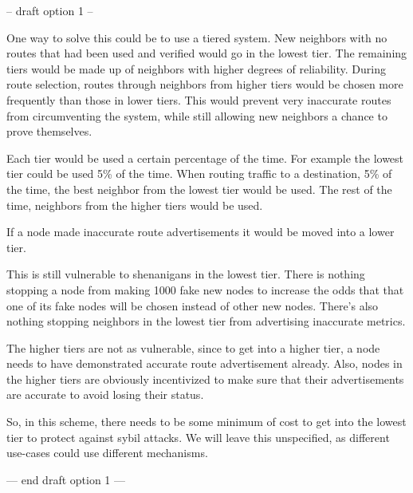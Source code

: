 \documentclass[11pt]{article}
\begin{document}
-- draft option 1 --

One way to solve this could be to use a tiered system. New neighbors with no routes that had been used and verified would go in the lowest tier. The remaining tiers would be made up of neighbors with higher degrees of reliability. During route selection, routes through neighbors from higher tiers would be chosen more frequently than those in lower tiers. This would prevent very inaccurate routes from circumventing the system, while still allowing new neighbors a chance to prove themselves.

Each tier would be used a certain percentage of the time. For example the lowest tier could be used 5\% of the time. When routing traffic to a destination, 5\% of the time, the best neighbor from the lowest tier would be used. The rest of the time, neighbors from the higher tiers would be used.

If a node made inaccurate route advertisements it would be moved into a lower tier.

This is still vulnerable to shenanigans in the lowest tier. There is nothing stopping a node from making 1000 fake new nodes to increase the odds that that one of its fake nodes will be chosen instead of other new nodes. There's also nothing stopping neighbors in the lowest tier from advertising inaccurate metrics.

The higher tiers are not as vulnerable, since to get into a higher tier, a node needs to have demonstrated accurate route advertisement already. Also, nodes in the higher tiers are obviously incentivized to make sure that their advertisements are accurate to avoid losing their status.

So, in this scheme, there needs to be some minimum of cost to get into the lowest tier to protect against sybil attacks. We will leave this unspecified, as different use-cases could use different mechanisms.

--- end draft option 1 ---

\medskip
\end{document}
